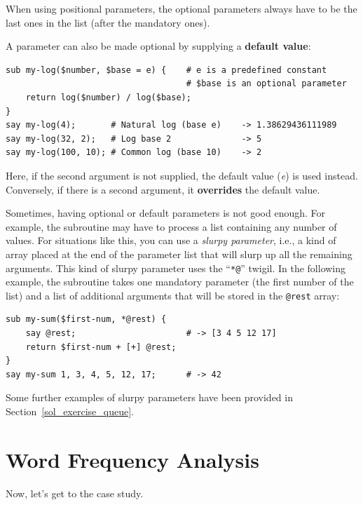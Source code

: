 When using positional parameters, the optional parameters 
always have to be the last ones in the list (after the 
mandatory ones).

A parameter can also be made optional by supplying a 
{\bf default value}:

\begin{verbatim}
sub my-log($number, $base = e) {    # e is a predefined constant
                                    # $base is an optional parameter
    return log($number) / log($base);
}
say my-log(4);       # Natural log (base e)    -> 1.38629436111989
say my-log(32, 2);   # Log base 2              -> 5
say my-log(100, 10); # Common log (base 10)    -> 2
\end{verbatim}

Here, if the second argument is not supplied, the default 
value (\emph{e}) is used instead. Conversely, if there 
is a second argument, it {\bf overrides} the default value.

\label{slurpy_parameters}
Sometimes, having optional or default parameters is not good 
enough. For example, the subroutine may have to process a list 
containing any number of values. For situations like this, 
you can use a \emph{slurpy parameter}, i.e., a kind of array 
placed at the end of the parameter list that will slurp up 
all the remaining arguments. This kind of slurpy parameter 
uses the ``\verb"*@"'' twigil. In the following example, 
the subroutine takes one mandatory parameter (the first 
number of the list) and a list of additional arguments 
that will be stored in the \verb'@rest' array:

\begin{verbatim}
sub my-sum($first-num, *@rest) {
    say @rest;                      # -> [3 4 5 12 17]
    return $first-num + [+] @rest;
}
say my-sum 1, 3, 4, 5, 12, 17;      # -> 42 
\end{verbatim}

Some further examples of slurpy parameters have been 
provided in Section~\ref{sol_exercise_queue}.

\section{Word Frequency Analysis}
\label{analysis}

Now, let's get to the case study.

